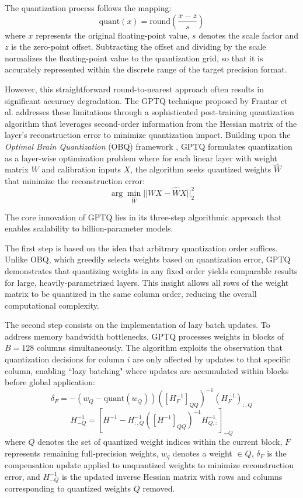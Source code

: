 The quantization process follows the mapping:
\begin{equation}
\text{quant}(x) = \text{round}\left(\frac{x - z}{s}\right)
\end{equation}
where $x$ represents the original floating-point value, $s$ denotes the scale factor and $z$ is the zero-point offset. Subtracting the offset and dividing by the scale normalizes the floating-point value to the quantization grid, so that it is accurately represented within the discrete range of the target precision format.

However, this straightforward round-to-nearest approach often results in significant accuracy degradation. The GPTQ technique proposed by Frantar et al. \cite{gptq_quantization} addresses these limitations through a sophisticated post-training quantization algorithm that leverages second-order information from the Hessian matrix of the layer's reconstruction error to minimize quantization impact. Building upon the \textit{Optimal Brain Quantization} (OBQ) framework \cite{obq}, GPTQ formulates quantization as a layer-wise optimization problem where for each linear layer with weight matrix $W$ and calibration inputs $X$, the algorithm seeks quantized weights $\hat{W}$ that minimize the reconstruction error:
\begin{equation}
\arg\min_{\hat{W}} ||WX - \hat{W}X||_2^2
\end{equation}

The core innovation of GPTQ lies in its three-step algorithmic approach that enables scalability to billion-parameter models.

The first step is based on the idea that arbitrary quantization order suffices. Unlike OBQ, which greedily selects weights based on quantization error, GPTQ demonstrates that quantizing weights in any fixed order yields comparable results for large, heavily-parametrized layers. This insight allows all rows of the weight matrix to be quantized in the same column order, reducing the overall computational complexity.

The second step consists on the implementation of lazy batch updates. To address memory bandwidth bottlenecks, GPTQ processes weights in blocks of $B=128$ columns simultaneously. The algorithm exploits the observation that quantization decisions for column $i$ are only affected by updates to that specific column, enabling ``lazy batching" where updates are accumulated within blocks before global application:
\begin{equation}
\delta_F = -(w_Q - \text{quant}(w_Q))([H_F^{-1}]_{QQ})^{-1}(H_F^{-1})_{:,Q}
\end{equation}
\begin{equation}
H_{-Q}^{-1} = \left[H^{-1} - H_{:,Q}^{-1}([H^{-1}]_{QQ})^{-1}H_{Q,:}^{-1}\right]_{-Q}
\end{equation}
where $Q$ denotes the set of quantized weight indices within the current block, $F$ represents remaining full-precision weights, $w_q$ denotes a weight $\in Q$, $\delta_F$ is the compensation update applied to unquantized weights to minimize reconstruction error, and $H_{-Q}^{-1}$ is the updated inverse Hessian matrix with rows and columns corresponding to quantized weights $Q$ removed.

